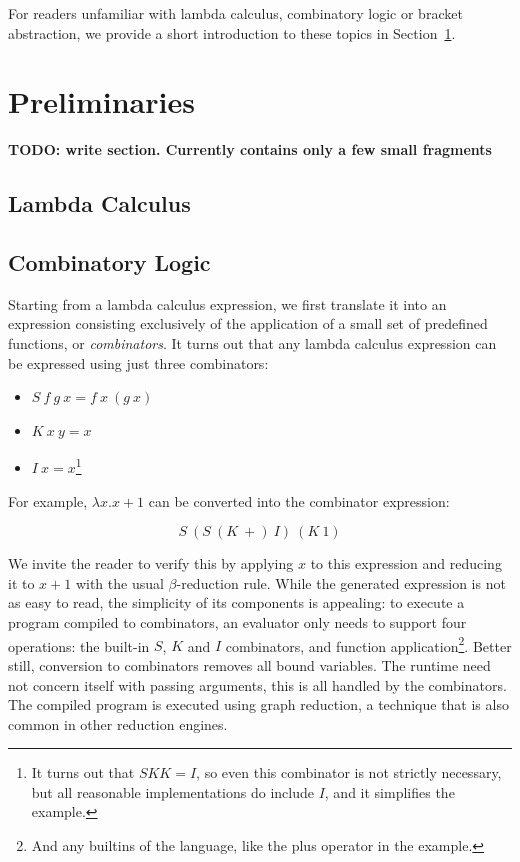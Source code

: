 \documentclass[conference]{IEEEtran}
\begin{document}
For readers unfamiliar with lambda calculus, combinatory logic or bracket abstraction, we provide a short introduction to these topics in Section~\ref{sec:prelim}.

\section{Preliminaries}
\label{sec:prelim}
\textbf{TODO: write section. Currently contains only a few small fragments}
\subsection{Lambda Calculus}

\subsection{Combinatory Logic}
Starting from a lambda calculus expression, we first translate it into an expression consisting exclusively of the application of a small set of predefined functions, or \textit{combinators}.
It turns out that any lambda calculus expression can be expressed using just three combinators:
\begin{itemize}
    \item $S \ f \ g \ x = f \ x \ (g \ x)$
    \item $K \ x \ y = x$
    \item $I \ x = x$\footnote{It turns out that $SKK = I$, so even this combinator is not strictly necessary, but all reasonable implementations do include $I$, and it simplifies the example.}
\end{itemize}

For example, $\lambda x.x+1$ can be converted into the combinator expression:

\[
    S \ (S \  (K \  +) \  I) \ (K \ 1)
\]

We invite the reader to verify this by applying $x$ to this expression and reducing it to $x+1$ with the usual $\beta$-reduction rule.
While the generated expression is not as easy to read, the simplicity of its components is appealing: to execute a program compiled to combinators, an evaluator only needs to support four operations: the built-in $S$, $K$ and $I$ combinators, and function application\footnote{And any builtins of the language, like the plus operator in the example.}.
Better still, conversion to combinators removes all bound variables.
The runtime need not concern itself with passing arguments, this is all handled by the combinators.
The compiled program is executed using graph reduction, a technique that is also common in other reduction engines\cite{kieburtz_g-machine_1985,fairbairn_tim_1987}.
\end{document}
